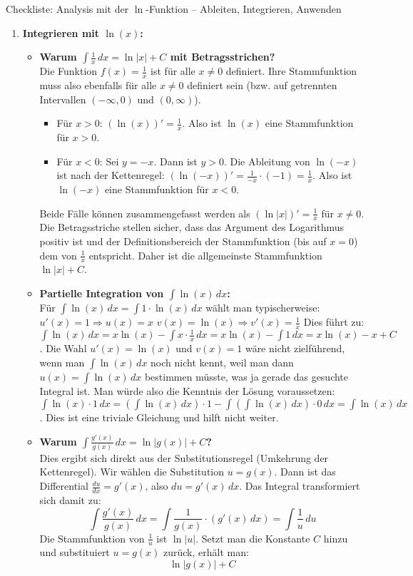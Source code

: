 \begin{loesungsumgebung}{Checkliste: Analysis mit der $\ln$-Funktion – Ableiten, Integrieren, Anwenden}
\begin{enumerate}[label=(\alph*)]
    \item \textbf{Integrieren mit $\ln(x)$:}
    \begin{itemize}
        \item \textbf{Warum $\int \frac{1}{x} \,dx = \ln|x|+C$ mit Betragsstrichen?} \\
        Die Funktion $f(x)=\frac{1}{x}$ ist für alle $x \neq 0$ definiert. Ihre Stammfunktion muss also ebenfalls für alle $x \neq 0$ definiert sein (bzw. auf getrennten Intervallen $(-\infty,0)$ und $(0,\infty)$).
        \begin{itemize}
            \item Für $x>0$: $(\ln(x))' = \frac{1}{x}$. Also ist $\ln(x)$ eine Stammfunktion für $x>0$.
            \item Für $x<0$: Sei $y=-x$. Dann ist $y>0$. Die Ableitung von $\ln(-x)$ ist nach der Kettenregel: $(\ln(-x))' = \frac{1}{-x} \cdot (-1) = \frac{1}{x}$. Also ist $\ln(-x)$ eine Stammfunktion für $x<0$.
        \end{itemize}
        Beide Fälle können zusammengefasst werden als $(\ln|x|)' = \frac{1}{x}$ für $x \neq 0$. Die Betragsstriche stellen sicher, dass das Argument des Logarithmus positiv ist und der Definitionsbereich der Stammfunktion (bis auf $x=0$) dem von $\frac{1}{x}$ entspricht. Daher ist die allgemeinste Stammfunktion $\ln|x|+C$.

        \item \textbf{Partielle Integration von $\int \ln(x) \,dx$:} \\
        Für $\int \ln(x) \,dx = \int 1 \cdot \ln(x) \,dx$ wählt man typischerweise:
        $u'(x)=1 \Rightarrow u(x)=x$
        $v(x)=\ln(x) \Rightarrow v'(x)=\frac{1}{x}$
        Dies führt zu: $\int \ln(x) \,dx = x\ln(x) - \int x \cdot \frac{1}{x} \,dx = x\ln(x) - \int 1 \,dx = x\ln(x) - x + C$.
        Die Wahl $u'(x)=\ln(x)$ und $v(x)=1$ wäre nicht zielführend, wenn man $\int \ln(x) \,dx$ noch nicht kennt, weil man dann $u(x) = \int \ln(x) \,dx$ bestimmen müsste, was ja gerade das gesuchte Integral ist. Man würde also die Kenntnis der Lösung voraussetzen:
        $\int \ln(x) \cdot 1 \,dx = (\int \ln(x) \,dx) \cdot 1 - \int (\int \ln(x) \,dx) \cdot 0 \,dx = \int \ln(x) \,dx$. Dies ist eine triviale Gleichung und hilft nicht weiter.

        \item \textbf{Warum $\int \frac{g'(x)}{g(x)} \,dx = \ln|g(x)|+C$?} \\
        Dies ergibt sich direkt aus der Substitutionsregel (Umkehrung der Kettenregel).
        Wir wählen die Substitution $u = g(x)$.
        Dann ist das Differential $\frac{du}{dx} = g'(x)$, also $du = g'(x) \,dx$.
        Das Integral transformiert sich damit zu:
        $$ \int \frac{g'(x)}{g(x)} \,dx = \int \frac{1}{g(x)} \cdot (g'(x) \,dx) = \int \frac{1}{u} \,du $$
        Die Stammfunktion von $\frac{1}{u}$ ist $\ln|u|$. Setzt man die Konstante $C$ hinzu und substituiert $u=g(x)$ zurück, erhält man:
        $$ \ln|g(x)| + C $$
    \end{itemize}


\end{enumerate}
\end{loesungsumgebung}
